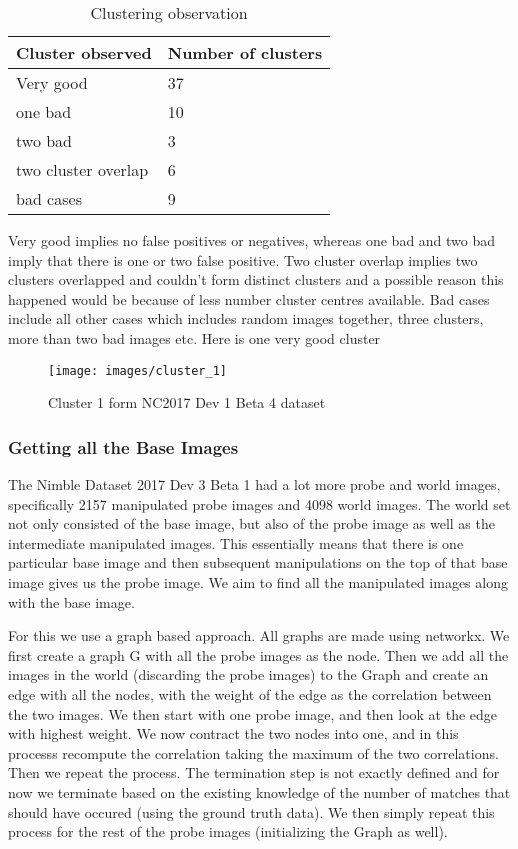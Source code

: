 \documentclass{article}
\begin{document}
\begin{table}[H]
\centering
\caption{Clustering observation}
\label{my-label}
\begin{tabular}{|l|l|}
  \hline
  Cluster observed    & Number of clusters \\
  \hline
  Very good              & 37                 \\
  one bad             & 10                 \\
  two bad             & 3                  \\
  two cluster overlap & 6                  \\
  bad cases           & 9                 \\
  \hline
\end{tabular}
\end{table}
Very good implies no false positives or negatives, whereas one bad and two bad imply that there is one or two false positive. Two cluster overlap implies two clusters overlapped and couldn't form distinct clusters and a possible reason this happened would be because of less number cluster centres available. Bad cases include all other cases which includes random images together, three clusters, more than two bad images etc. Here is one very good cluster

\begin{figure}[H]
  \centering
  \texttt{[image: images/cluster\_1]}
  \caption{Cluster 1 form NC2017 Dev 1 Beta 4 dataset}
  \label{fig:cluster}
\end{figure}

\subsubsection{Getting all the Base Images}
The Nimble Dataset 2017 Dev 3 Beta 1 had a lot more probe and world images, specifically 2157 manipulated probe images and 4098 world images. The world set not only consisted of the base image, but also of the probe image as well as the intermediate manipulated images. This essentially means that there is one particular base image and then subsequent manipulations on the top of that base image gives us the probe image. We aim to find all the manipulated images along with the base image.

For this we use a graph based approach. All graphs are made using networkx. We first create a graph G with all the probe images as the node. Then we add all the images in the world (discarding the probe images) to the Graph and create an edge with all the nodes, with the weight of the edge as the correlation between the two images. We then start with one probe image, and then look at the edge with highest weight. We now contract the two nodes into one, and in this processs recompute the correlation taking the maximum of the two correlations. Then we repeat the process. The termination step is not exactly defined and for now we terminate based on the existing knowledge of the number of matches that should have occured (using the ground truth data). We then simply repeat this process for the rest of the probe images (initializing the Graph as well).
\end{document}
